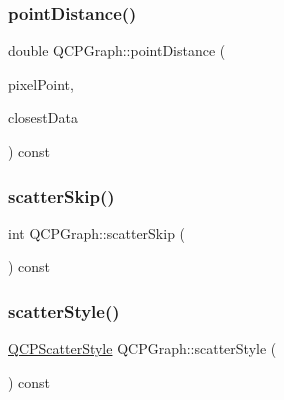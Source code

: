 \subsubsection{\texorpdfstring{point\+Distance()}{pointDistance()}}
{\footnotesize\ttfamily double Q\+C\+P\+Graph\+::point\+Distance (\begin{DoxyParamCaption}\item[{const Q\+PointF \&}]{pixel\+Point,  }\item[{\hyperlink{class_q_c_p_data_container_ae40a91f5cb0bcac61d727427449b7d15}{Q\+C\+P\+Graph\+Data\+Container\+::const\+\_\+iterator} \&}]{closest\+Data }\end{DoxyParamCaption}) const\hspace{0.3cm}{\ttfamily [protected]}}

\mbox{\label{class_q_c_p_graph_a44487a3a706605bb9fc97ad5e05d347e}} 
\subsubsection{\texorpdfstring{scatter\+Skip()}{scatterSkip()}}
{\footnotesize\ttfamily int Q\+C\+P\+Graph\+::scatter\+Skip (\begin{DoxyParamCaption}{ }\end{DoxyParamCaption}) const\hspace{0.3cm}{\ttfamily [inline]}}

\mbox{\label{class_q_c_p_graph_a36d5b641db08e27527827c212542bbbd}} 
\subsubsection{\texorpdfstring{scatter\+Style()}{scatterStyle()}}
{\footnotesize\ttfamily \hyperlink{class_q_c_p_scatter_style}{Q\+C\+P\+Scatter\+Style} Q\+C\+P\+Graph\+::scatter\+Style (\begin{DoxyParamCaption}{ }\end{DoxyParamCaption}) const\hspace{0.3cm}{\ttfamily [inline]}}

\mbox{\label{class_q_c_p_graph_abb9c674b207a1f6df5e083aa9f3e071a}} 

